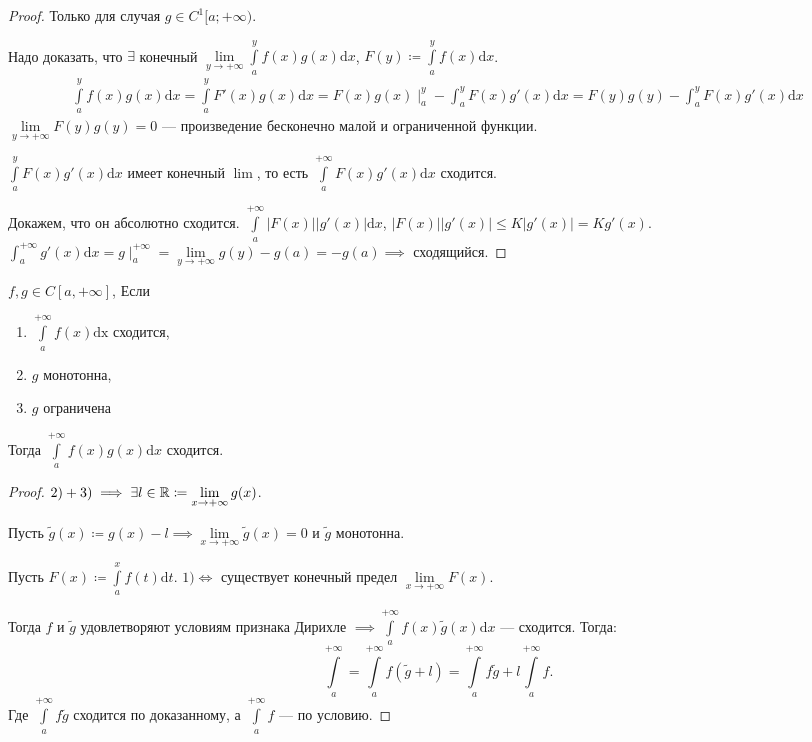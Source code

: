 \begin{proof}
    Только для случая $g \in C^1[a; +\infty)$. 

    Надо доказать, что  $\exists$ конечный  $\lim\limits_{y \to +\infty} \int\limits_a^y f(x)g(x) \mathrm{d}x$,  $F(y) \coloneqq \int\limits_a^y f(x)\mathrm{d}x$. 
    \begin{align*}
        \int\limits_a^y f(x)g(x)\mathrm{d}x = \int\limits_a^y F'(x)g(x) \mathrm{d}x = F(x)g(x) \mid_a^y - \int_a^y F(x) g'(x) \mathrm{d}x = F(y)g(y) - \int_a^y F(x)g'(x) \mathrm{d}x
    \end{align*}
    $\lim\limits_{y \to +\infty} F(y)g(y) = 0$ --- произведение бесконечно малой и ограниченной функции.

    $\int\limits_a^y F(x)g'(x)\mathrm{d}x$ имеет конечный  $\lim$, то есть  $\int\limits_a^{+\infty} F(x)g'(x) \mathrm{d}x$ сходится. 

    Докажем, что он абсолютно сходится.  $\int\limits_a^{+\infty} |F(x)| |g'(x)| \mathrm{d}x$, $|F(x)||g'(x)| \le K|g'(x)| = Kg'(x)$. $\int_a^{+\infty} g'(x) \mathrm{d}x = g \mid_a^{+\infty} = \lim\limits_{y \to +\infty} g(y) - g(a) = -g(a) \implies$ сходящийся.
\end{proof}
\begin{theorem}
    $f, g \in C[a, +\infty]$, Если 
     \begin{enumerate}
         \item $\int\limits_a^{+\infty} f(x) \mathrm{dx}$ сходится,
         \item  $g$ монотонна,
         \item  $g$ ограничена
    \end{enumerate}
    Тогда $\int\limits_a^{+\infty} f(x)g(x) \mathrm{d}x$ сходится.
\end{theorem}
\begin{proof}
    $2)+3) \implies \exists l \in \mathbb{R} \coloneqq \lim\limits_{x \to +\infty} g(x)$.

    Пусть $\widetilde{g}(x) \coloneqq g(x) - l \implies \lim\limits_{x \to +\infty}\widetilde{g}(x) = 0$ и  $\widetilde{g}$ монотонна.

    Пусть  $F(x) \coloneqq \int\limits_a^x f(t) \mathrm{d}t$.  $1) \iff$ существует конечный предел  $\lim\limits_{x \to +\infty} F(x)$.

    Тогда  $f$ и  $\widetilde{g}$ удовлетворяют условиям признака Дирихле $\implies \int\limits_a^{+\infty} f(x) \widetilde{g}(x) \mathrm{d}x$ --- сходится. Тогда: \[
    \int\limits_a^{+\infty} = \int\limits_a^{+\infty} f(\widetilde{g}+l) = \int\limits_a^{+\infty} f\widetilde{g} + l \int\limits_a^{+\infty} f
    .\] 
    Где $\int\limits_a^{+\infty} f\widetilde{g}$ сходится по доказанному, а  $\int\limits_a^{+\infty} f$ --- по условию.
\end{proof}
